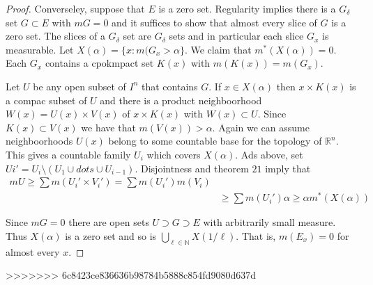 \documentclass[letter]{article}
\newenvironment{menumerate}{%
  \edef\backupindent{\the\parindent}%
  \enumerate%
  \setlength{\parindent}{\backupindent}%
}{\endenumerate}
\begin{document}
\begin{menumerate}
\begin{proof}
        Converseley, suppose that $E$ is a zero set. Regularity implies there is a $G_\delta$ set $G \subset E$ with $mG = 0$
        and it suffices to show that almost every slice of $G$ is a zero set.
        The slices of a $G_\delta$ set are $G_\delta$ sets and in particular each slice $G_x$ is measurable.
        Let $X(\alpha) = \{x : m(G_x > \alpha\}. $ We claim that $m^*(X(\alpha)) = 0.$ Each $G_x$ contains a cpokmpact set
        $K(x)$ with $m(K(x)) = m(G_x).$

        Let $U$ be any open subset of $I^n$ that contains $G$. If $x \in X(\alpha)$ then $x \times K(x)$ is a compac
        subset of $U$ and there is a product neighboorhood $W(x) = U(x) \times V(x)$ of $x\times K(x)$ with $W(x) \subset U.$
        Since $K(x) \subset V(x)$ we have that $m(V(x)) > \alpha.$ Again we can assume neighboorhoods $U(x)$ belong
        to some countable base for the topology of $\mathbb{R}^n.$ This gives a countable family $U_i$ which covers
        $X(\alpha).$ Ads above, set $Ui' = U_i \setminus (U_1 \cup dots \cup U_{i-1}).$ Disjointness and theorem $21$
        imply that
        \begin{equation}
            \begin{aligned}
                mU \geq \sum m(U_i'\times V_i') = \sum m(U_i') m(V_i) \\
                &\geq \sum m(U_i')\alpha \geq \alpha m^*(X(\alpha))
            \end{aligned}
         \end{equation} 

         Since $mG = 0$ there are open sets $U \supset G \supset E$ with arbitrarily small measure. Thus $X(\alpha)$
         is a zero set and so is $\bigcup_{\ell \in \mathbb{N}} X(1/\ell)$. That is, $m(E_x) = 0$ for almost every $x.$
    \end{proof}
\end{menumerate}
>>>>>>> 6c8423ce836636b98784b5888c854fd9080d637d
\end{document}

